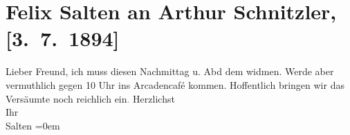 

         \renewcommand{\erwaehnteOrte}{Orte: Café Arkaden, Wien}
         \renewcommand{\erwaehnteWerke}{}
               \section[Felix Salten an Arthur Schnitzler, {[}3. 7. 1894{]}]{ Felix Salten an Arthur Schnitzler, {[}3. 7. 1894{]}}\nopagebreak{}\rehead{ }\begin{ledgroupsized}[t]{13cm}\normalsize\beginnumbering \toendnotes[C]{\smallbreak\pagebreak[2]} 
\toendnotes[C]{\smallbreak}\pstart
           \noindent{}{\pb}Lieber Freund, ich muss diesen Nachmittag
               u. Abd dem \label{K_L03140-1v}\label{K_L03140-1h} widmen. Werde aber
               vermuthlich gegen 10 Uhr ins Arcadencafé kommen.\pend
           \pstart
           Hoffentlich bringen wir das Versäumte noch reichlich ein\textcolor{gray}{.}\pend
           \pstart
           Herzlichst {\\[\baselineskip]}Ihr {\\[\baselineskip]}\spacefill\mbox{Salten}\pend
           \leftskip=0em{}
         
         \endnumbering{}\end{ledgroupsized}  \newcommand{\dateiname}{L03140}\newcommand{\titel}{Felix Salten an Arthur Schnitzler, [3. 7. 1894]}\newcommand{\editorInnen}{Martin Anton Müller und Laura Untner}
      